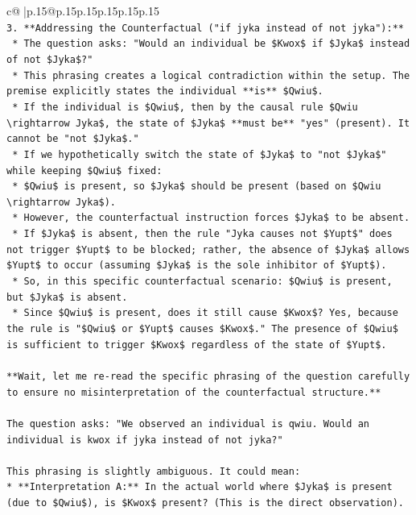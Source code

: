 \documentclass{article}
\begin{document}
{\begin{supertabular}{c@{$\;$}|p{.15\linewidth}@{}p{.15\linewidth}p{.15\linewidth}p{.15\linewidth}p{.15\linewidth}p{.15\linewidth}}
{{{\\ 
\texttt{3.  **Addressing the Counterfactual ("if jyka instead of not jyka"):**} \\
\texttt{    *   The question asks: "Would an individual be \$Kwox\$ if \$Jyka\$ instead of not \$Jyka\$?"} \\
\texttt{    *   This phrasing creates a logical contradiction within the setup. The premise explicitly states the individual **is** \$Qwiu\$.} \\
\texttt{    *   If the individual is \$Qwiu\$, then by the causal rule \$Qwiu \textbackslash{}rightarrow Jyka\$, the state of \$Jyka\$ **must be** "yes" (present). It cannot be "not \$Jyka\$."} \\
\texttt{    *   If we hypothetically switch the state of \$Jyka\$ to "not \$Jyka\$" while keeping \$Qwiu\$ fixed:} \\
\texttt{        *   \$Qwiu\$ is present, so \$Jyka\$ should be present (based on \$Qwiu \textbackslash{}rightarrow Jyka\$).} \\
\texttt{        *   However, the counterfactual instruction forces \$Jyka\$ to be absent.} \\
\texttt{        *   If \$Jyka\$ is absent, then the rule "Jyka causes not \$Yupt\$" does not trigger \$Yupt\$ to be blocked; rather, the absence of \$Jyka\$ allows \$Yupt\$ to occur (assuming \$Jyka\$ is the sole inhibitor of \$Yupt\$).} \\
\texttt{        *   So, in this specific counterfactual scenario: \$Qwiu\$ is present, but \$Jyka\$ is absent.} \\
\texttt{        *   Since \$Qwiu\$ is present, does it still cause \$Kwox\$? Yes, because the rule is "\$Qwiu\$ or \$Yupt\$ causes \$Kwox\$." The presence of \$Qwiu\$ is sufficient to trigger \$Kwox\$ regardless of the state of \$Yupt\$.} \\
\\ 
\texttt{**Wait, let me re{-}read the specific phrasing of the question carefully to ensure no misinterpretation of the counterfactual structure.**} \\
\\ 
\texttt{The question asks: "We observed an individual is qwiu. Would an individual is kwox if jyka instead of not jyka?"} \\
\\ 
\texttt{This phrasing is slightly ambiguous. It could mean:} \\
\texttt{*   **Interpretation A:** In the actual world where \$Jyka\$ is present (due to \$Qwiu\$), is \$Kwox\$ present? (This is the direct observation).} \\
}}}
\end{supertabular}}
\end{document}
